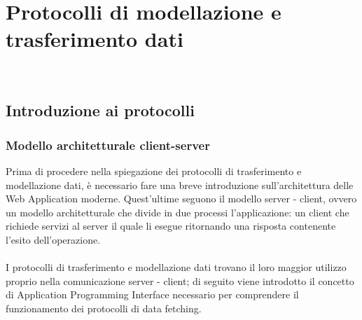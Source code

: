 
\chapter{Protocolli di modellazione e trasferimento dati}
\label{protocolli-trasmissione-dati}

\\

\section{Introduzione ai protocolli}
\subsection{Modello architetturale client-server}
\label{client-server}
Prima di procedere nella spiegazione dei protocolli di trasferimento e modellazione dati, è necessario fare una breve introduzione sull'architettura delle Web Application moderne. Quest'ultime seguono il modello server - client, ovvero un modello architetturale che divide in due processi l'applicazione: un client che richiede servizi al server il quale li esegue ritornando una risposta contenente l'esito dell'operazione. \\\\
I protocolli di trasferimento e modellazione dati trovano il loro maggior utilizzo proprio nella comunicazione server - client; di seguito viene introdotto il concetto di Application Programming Interface necessario per comprendere il funzionamento dei protocolli di data fetching.
